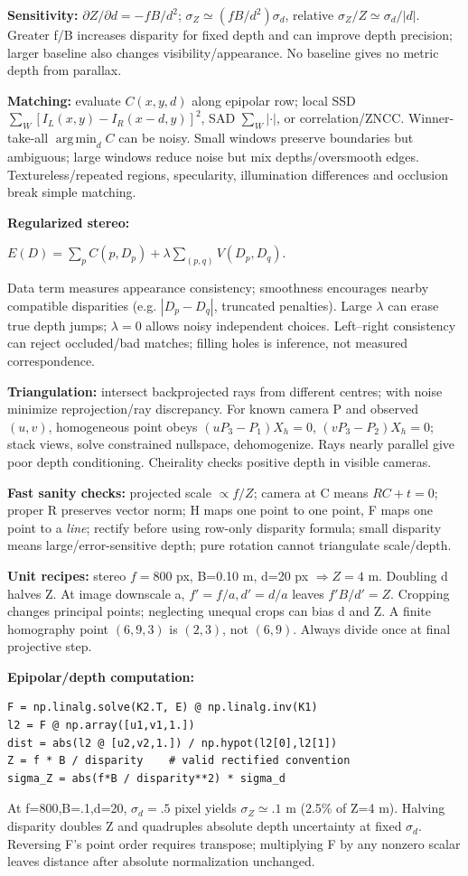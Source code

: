 \documentclass[a4paper]{article}
\newcommand{\key}[1]{\textbf{#1}}
\newcommand{\eq}[1]{\par\noindent\mbox{\(\displaystyle #1\)}\par}
\newcommand{\argmin}{\operatorname*{arg\,min}}
\newcounter{sheet}
\newcounter{sheetcolumn}
\newlength{\colwidth}
\newenvironment{sheetcol}[1][7.0]{\stepcounter{sheetcolumn}
  \begin{lrbox}{\columnbox}\begin{minipage}[t]{\colwidth}\vspace{0pt}
  \fontsize{#1}{\dimexpr#1pt+0.6pt\relax}\selectfont}
  {\end{minipage}\end{lrbox}
  \typeout{CV1COL|\thesheet|\thesheetcolumn|\the\dimexpr\ht\columnbox+\dp\columnbox\relax}
  \usebox{\columnbox}\ignorespacesafterend}
\begin{document}
\begin{sheetcol}
\key{Sensitivity:} \(\partial Z/\partial d=-fB/d^2\); \(\sigma_Z\simeq(fB/d^2)\sigma_d\), relative \(\sigma_Z/Z\simeq\sigma_d/|d|\). Greater f/B increases disparity for fixed depth and can improve depth precision; larger baseline also changes visibility/appearance. No baseline gives no metric depth from parallax.

\key{Matching:} evaluate \(C(x,y,d)\) along epipolar row; local SSD \(\sum_W[I_L(x,y)-I_R(x-d,y)]^2\), SAD \(\sum_W|\cdot|\), or correlation/ZNCC. Winner-take-all \(\argmin_d C\) can be noisy. Small windows preserve boundaries but ambiguous; large windows reduce noise but mix depths/oversmooth edges. Textureless/repeated regions, specularity, illumination differences and occlusion break simple matching.

\key{Regularized stereo:}
\eq{E(D)=\sum_p C(p,D_p)+\lambda\sum_{(p,q)}V(D_p,D_q).}
Data term measures appearance consistency; smoothness encourages nearby compatible disparities (e.g. \(|D_p-D_q|\), truncated penalties). Large \(\lambda\) can erase true depth jumps; \(\lambda=0\) allows noisy independent choices. Left--right consistency can reject occluded/bad matches; filling holes is inference, not measured correspondence.

\key{Triangulation:} intersect backprojected rays from different centres; with noise minimize reprojection/ray discrepancy. For known camera P and observed \((u,v)\), homogeneous point obeys \((uP_3-P_1)X_h=0\), \((vP_3-P_2)X_h=0\); stack views, solve constrained nullspace, dehomogenize. Rays nearly parallel give poor depth conditioning. Cheirality checks positive depth in visible cameras.

\key{Fast sanity checks:} projected scale \(\propto f/Z\); camera at C means \(RC+t=0\); proper R preserves vector norm; H maps one point to one point, F maps one point to a \emph{line}; rectify before using row-only disparity formula; small disparity means large/error-sensitive depth; pure rotation cannot triangulate scale/depth.

\key{Unit recipes:} stereo \(f=800\) px, B=0.10 m, d=20 px \(\Rightarrow Z=4\) m. Doubling d halves Z. At image downscale a, \(f'=f/a,d'=d/a\) leaves \(f'B/d'=Z\). Cropping changes principal points; neglecting unequal crops can bias d and Z. A finite homography point \((6,9,3)\) is \((2,3)\), not \((6,9)\). Always divide once at final projective step.

\key{Epipolar/depth computation:}
\begin{lstlisting}
F = np.linalg.solve(K2.T, E) @ np.linalg.inv(K1)
l2 = F @ np.array([u1,v1,1.])
dist = abs(l2 @ [u2,v2,1.]) / np.hypot(l2[0],l2[1])
Z = f * B / disparity    # valid rectified convention
sigma_Z = abs(f*B / disparity**2) * sigma_d
\end{lstlisting}
At f=800,B=.1,d=20, \(\sigma_d=.5\) pixel yields \(\sigma_Z\simeq.1\) m (2.5\% of Z=4 m). Halving disparity doubles Z and quadruples absolute depth uncertainty at fixed \(\sigma_d\). Reversing F's point order requires transpose; multiplying F by any nonzero scalar leaves distance after absolute normalization unchanged.


\end{sheetcol}
\end{document}
